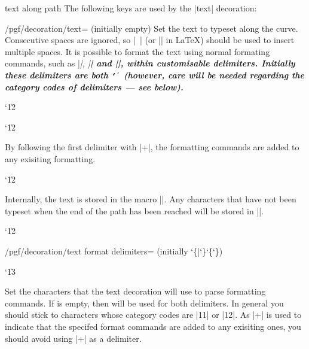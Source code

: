 \begin{decoration}{text along path}
  The following keys are used by the |text| decoration:
  \begin{key}{/pgf/decoration/text=
      (initially \normalfont empty)}
    Set the text to typeset along the curve. 
    Consecutive spaces are ignored, so |\ | (or |\space| in \LaTeX) 
    should be used to insert multiple spaces.	It is possible to
    format the text using normal formating commands, such as |\it|, |\bf|
    and |\color|, within customisable delimiters. Initially these
    delimiters are both {\tt\char`\|} (however, care will be needed 
    regarding	the category codes of delimiters --- see below). 

{\catcode`\|12
\begin{codeexample}[]
\catcode`\|12
\end{codeexample}
}
    By following the first delimiter
    with |+|, the formatting commands are added to any exisiting 
    formatting.

{\catcode`\|12
\begin{codeexample}[]
\end{codeexample}
}
	
    Internally, the text is stored in the macro |\pgfdecorationtext|. 
    Any characters that have not been typeset when the end of the 
    path has been reached will be stored in |\pgfdecorationrestoftext|.
    
  \end{key}

{\catcode`\|12
  \begin{key}{/pgf/decoration/text format delimiters= (initially \char`\{|\char`\}\char`\{\char`\})}

    \catcode`\|13
	
    Set the characters that the text decoration will use to parse 
    formatting commands. 
    If  is empty, then  will be used for both
    delimiters.
    In general you should stick to characters	whose category codes are 
    |11| or |12|.
    As |+| is used to indicate that the specifed format commands 
    are added	to any exisiting ones, you should avoid using |+| as
    a delimiter. 


\end{key}}
\end{decoration}
